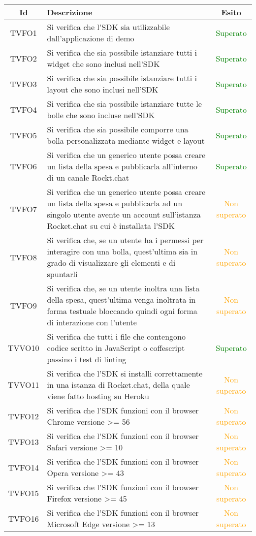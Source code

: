 \begin{center}
	\begin{longtable}{|c|>{\centering}m{10cm}|c|}\hline
		Id & Descrizione & Esito\\ \hline
		TVFO1 & Si verifica che l'SDK sia utilizzabile dall'applicazione di demo & \textcolor{Green}{Superato}\\ \hline
		TVFO2 & Si verifica che sia possibile istanziare tutti i widget che sono inclusi nell'SDK & \textcolor{Green}{Superato}\\ \hline
		TVFO3 & Si verifica che sia possibile istanziare tutti i layout che sono inclusi nell'SDK & \textcolor{Green}{Superato}\\ \hline
		TVFO4 & Si verifica che sia possibile istanziare tutte le bolle che sono incluse nell'SDK & \textcolor{Green}{Superato}\\ \hline
		TVFO5 & Si verifica che sia possibile comporre una bolla personalizzata mediante widget e layout & \textcolor{Green}{Superato}\\ \hline
		TVFO6 & Si verifica che un generico utente possa creare un lista della spesa e pubblicarla all'interno di un canale Rockt.chat & \textcolor{Green}{Superato}\\ \hline
		TVFO7 & Si verifica che un generico utente possa creare un lista della spesa e pubblicarla ad un singolo utente avente un account sull'istanza Rocket.chat su cui è installata l'SDK & \textcolor{Orange}{Non superato}\\ \hline
		TVFO8 & Si verifica che, se un utente ha i permessi per interagire con una bolla, quest'ultima sia in grado di visualizzare gli elementi e di spuntarli & \textcolor{Orange}{Non superato}\\ \hline
		TVFO9 & Si verifica che, se un utente inoltra una lista della spesa, quest'ultima venga inoltrata in forma testuale bloccando quindi ogni forma di interazione con l'utente & \textcolor{Orange}{Non superato}\\ \hline
		TVVO10 & Si verifica che tutti i file che contengono codice scritto in JavaScript o coffescript passino i test di linting & \textcolor{Green}{Superato}\\ \hline
		TVVO11 & Si verifica che l'SDK si installi correttamente in una istanza di Rocket.chat, della quale viene fatto hosting su Heroku & \textcolor{Orange}{Non superato}\\ \hline
		TVFO12 & Si verifica che l'SDK funzioni con il browser Chrome versione >= 56 & \textcolor{Orange}{Non superato}\\ \hline
		TVFO13 & Si verifica che l'SDK funzioni con il browser Safari versione >= 10 & \textcolor{Orange}{Non superato}\\ \hline
		TVFO14 & Si verifica che l'SDK funzioni con il browser Opera versione >= 43 & \textcolor{Orange}{Non superato}\\ \hline
		TVFO15 & Si verifica che l'SDK funzioni con il browser Firefox versione >= 45 & \textcolor{Orange}{Non superato}\\ \hline
		TVFO16 & Si verifica che l'SDK funzioni con il browser Microsoft Edge versione >= 13 & \textcolor{Orange}{Non superato}\\ \hline
	\end{longtable}
\end{center}
